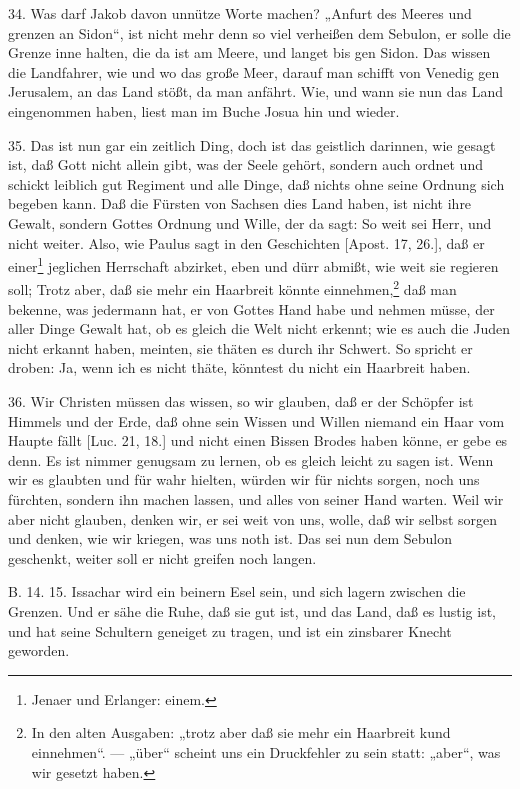 34. Was darf Jakob davon unnütze Worte machen? „Anfurt des Meeres und grenzen an Sidon“, ist nicht mehr denn so viel verheißen dem Sebulon, er solle die Grenze inne halten, die da ist am Meere, und langet bis gen Sidon. Das wissen die Landfahrer, wie und wo das große Meer, darauf man schifft von Venedig gen Jerusalem, an das Land stößt, da man anfährt. Wie, und wann sie nun das Land eingenommen haben, liest man im Buche Josua hin und wieder.

35. Das ist nun gar ein zeitlich Ding, doch ist das geistlich darinnen, wie gesagt ist, daß Gott nicht allein gibt, was der Seele gehört, sondern auch ordnet und schickt leiblich gut Regiment und alle Dinge, daß nichts ohne seine Ordnung sich begeben kann. Daß die Fürsten von Sachsen dies Land haben, ist nicht ihre Gewalt, sondern Gottes Ordnung und Wille, der da sagt: So weit sei Herr, und nicht weiter. Also, wie Paulus sagt in den Geschichten [Apost. 17, 26.], daß er einer\footnote{Jenaer und Erlanger: einem.} jeglichen Herrschaft abzirket, eben und dürr abmißt, wie weit sie regieren soll; Trotz aber, daß sie mehr ein Haarbreit könnte einnehmen,\footnote{In den alten Ausgaben: „trotz aber daß sie mehr ein Haarbreit kund einnehmen“. — „über“ scheint uns ein Druckfehler zu sein statt: „aber“, was wir gesetzt haben.} daß man bekenne, was jedermann hat, er von Gottes Hand habe und nehmen müsse, der aller Dinge Gewalt hat, ob es gleich die Welt nicht erkennt; wie es auch die Juden nicht erkannt haben, meinten, sie thäten es durch ihr Schwert. So spricht er droben: Ja, wenn ich es nicht thäte, könntest du nicht ein Haarbreit haben.

36. Wir Christen müssen das wissen, so wir glauben, daß er der Schöpfer ist Himmels und der Erde, daß ohne sein Wissen und Willen niemand ein Haar vom Haupte fällt [Luc. 21, 18.] und nicht einen Bissen Brodes haben könne, er gebe es denn. Es ist nimmer genugsam zu lernen, ob es gleich leicht zu sagen ist. Wenn wir es glaubten und für wahr hielten, würden wir für nichts sorgen, noch uns fürchten, sondern
ihn machen lassen, und alles von seiner Hand warten. Weil wir aber nicht glauben, denken wir, er sei weit von uns, wolle, daß wir selbst sorgen und denken, wie wir kriegen, was uns noth ist. Das sei nun dem Sebulon geschenkt, weiter soll er nicht greifen noch langen.

B. 14. 15. Issachar wird ein beinern Esel sein, und sich lagern zwischen die Grenzen. Und er sähe die Ruhe, daß sie gut ist, und das Land, daß es lustig ist, und hat seine Schultern geneiget zu tragen, und ist ein zinsbarer Knecht geworden.

